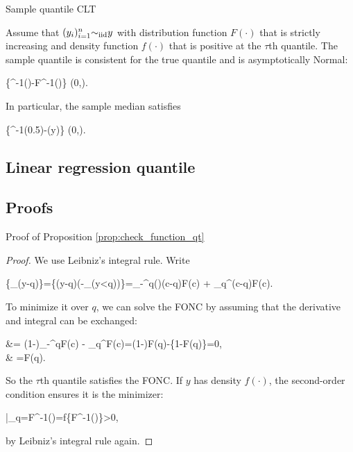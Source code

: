 \documentclass[10pt,a4paper]{book}
\begin{document}
\begin{thmbox}{Sample quantile CLT}
	\begin{theorem}\label{thm:CLT_qt}
		Assume that $(y_i)_{i=1}^n{\sim}_{\mathrm{iid}} y$ with distribution function $F(\cdot)$ that is strictly increasing and density function $f(\cdot)$ that is positive at the $\tau$th quantile. 
		The sample quantile is consistent for the true quantile and is asymptotically Normal:
		\begin{sequation*}
			\left\{^{-1}(\tau)-F^{-1}(\tau)\right\} \dto \rmN\left(0,\right).
		\end{sequation*}
		In particular, the sample median satisfies 
		\begin{sequation*}
			\left\{^{-1}(0.5)-(y)\right\} \dto \rmN\left(0,\right).
		\end{sequation*}
	\end{theorem}
\end{thmbox}

\subsection{Linear regression quantile}


\subsection{Proofs}
\begin{pfbox}{Proof of Proposition \ref{prop:check_function_qt}}
	\begin{proof}
		We use Leibniz's integral rule. Write 
		\begin{salign*}
			\bbE\{\rho_{\tau}(y-q)\}=\bbE\{(y-q)(\tau-\1_{(y<q)})\}=\int_{-\infty }^{q}()(c-q)\rmd F(c) + \int_{q}^{\infty }\tau (c-q)\rmd F(c).
		\end{salign*}
		To minimize it over $q$, we can solve the FONC by assuming that the derivative and integral can be exchanged:
		\begin{salign*}
			 &= (1-\tau)\int_{-\infty }^{q}\rmd F(c) - \tau \int_{q}^{\infty }\rmd F(c)=(1-\tau)F(q)-\tau\{1-F(q)\}=0,\\
			& \Rightarrow \tau=F(q).
		\end{salign*} 
		So the $\tau$th quantile satisfies the FONC.
		If $y$ has density $f(\cdot)$, the second-order condition ensures it is the minimizer:
		\begin{sequation*}
			\bigg|_{q=F^{-1}(\tau)}=f\{F^{-1}(\tau)\}>0,
		\end{sequation*}   
		by Leibniz's integral rule again.
	\end{proof}
\end{pfbox}
\end{document}
